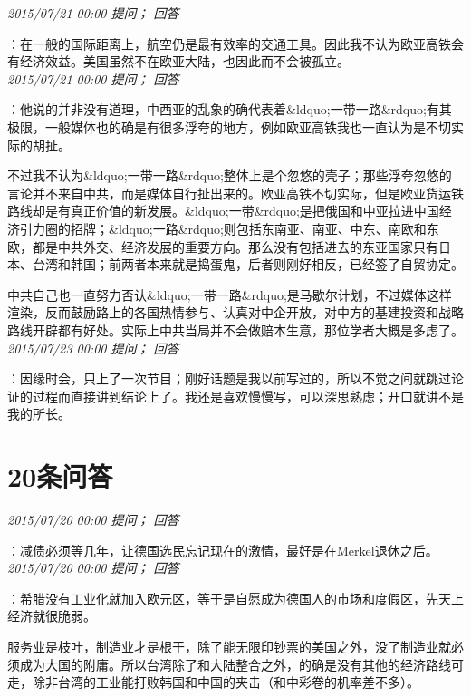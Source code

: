 \documentclass[twocolumn]{ctexart}
\begin{document}
\textit{\hfill\noindent\small 2015/07/21 00:00 提问； 回答}

：在一般的国际距离上，航空仍是最有效率的交通工具。因此我不认为欧亚高铁会有经济效益。美国虽然不在欧亚大陆，也因此而不会被孤立。\\

\textit{\hfill\noindent\small 2015/07/21 00:00 提问； 回答}

：他说的并非没有道理，中西亚的乱象的确代表着\&ldquo;一带一路\&rdquo;有其极限，一般媒体也的确是有很多浮夸的地方，例如欧亚高铁我也一直认为是不切实际的胡扯。

不过我不认为\&ldquo;一带一路\&rdquo;整体上是个忽悠的壳子；那些浮夸忽悠的言论并不来自中共，而是媒体自行扯出来的。欧亚高铁不切实际，但是欧亚货运铁路线却是有真正价值的新发展。\&ldquo;一带\&rdquo;是把俄国和中亚拉进中国经济引力圈的招牌；\&ldquo;一路\&rdquo;则包括东南亚、南亚、中东、南欧和东欧，都是中共外交、经济发展的重要方向。那么没有包括进去的东亚国家只有日本、台湾和韩国；前两者本来就是捣蛋鬼，后者则刚好相反，已经签了自贸协定。

中共自己也一直努力否认\&ldquo;一带一路\&rdquo;是马歇尔计划，不过媒体这样渲染，反而鼓励路上的各国热情参与、认真对中企开放，对中方的基建投资和战略路线开辟都有好处。实际上中共当局并不会做赔本生意，那位学者大概是多虑了。\\

\textit{\hfill\noindent\small 2015/07/23 00:00 提问； 回答}

：因缘时会，只上了一次节目；刚好话题是我以前写过的，所以不觉之间就跳过论证的过程而直接讲到结论上了。我还是喜欢慢慢写，可以深思熟虑；开口就讲不是我的所长。\\

\section{20条问答}

\textit{\hfill\noindent\small 2015/07/20 00:00 提问； 回答}

：减债必须等几年，让德国选民忘记现在的激情，最好是在Merkel退休之后。\\

\textit{\hfill\noindent\small 2015/07/20 00:00 提问； 回答}

：希腊没有工业化就加入欧元区，等于是自愿成为德国人的市场和度假区，先天上经济就很脆弱。

服务业是枝叶，制造业才是根干，除了能无限印钞票的美国之外，没了制造业就必须成为大国的附庸。所以台湾除了和大陆整合之外，的确是没有其他的经济路线可走，除非台湾的工业能打败韩国和中国的夹击（和中彩卷的机率差不多）。\\
\end{document}
